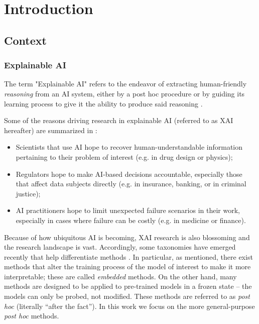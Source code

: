 \documentclass[../main.tex]{subfiles}
\begin{document}
\chapter{Introduction}
\label{ch:introduction}

\section{Context}

\subsection{Explainable AI}

The term "Explainable AI" refers to the endeavor of extracting human-friendly \emph{reasoning} from an AI system, either by a post hoc procedure or by guiding its learning process to give it the ability to produce said reasoning \cite{zhangSurvey2021}.

Some of the reasons driving research in explainable AI (referred to as XAI hereafter) are summarized in \cite{zhangSurvey2021}:
\begin{itemize}
    \item Scientists that use AI hope to recover human-understandable information pertaining to their problem of interest (e.g. in drug design or physics);
    \item Regulators hope to make AI-based decisions accountable, especially those that affect data subjects directly (e.g. in insurance, banking, or in criminal justice);
    \item AI practitioners hope to limit unexpected failure scenarios in their work, especially in cases where failure can be costly (e.g. in medicine or finance).
\end{itemize}


Because of how ubiquitous AI is becoming, XAI research is also blossoming and the research landscape is vast.
Accordingly, some taxonomies have emerged recently that help differentiate methods \cite{zhangSurvey2021, bellePrinciples2021}.
In particular, as mentioned, there exist methods that alter the training process of the model of interest to make it more interpretable; these are called \emph{embedded} methods.
On the other hand, many methods are designed to be applied to pre-trained models in a frozen state -- the models can only be probed, not modified. These methods are referred to as \textsl{post hoc} (literally ``after the fact'').
In this work we focus on the more general-purpose \textsl{post hoc} methods.
\end{document}
